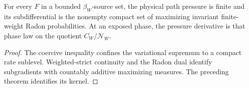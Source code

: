 \begin{corollary}
\label{cor:r4-a3-strict-tangent}
For every \(F\) in a bounded \(\beta_W\)-source set, the physical path
pressure is finite and its subdifferential is the nonempty compact set of
maximizing invariant finite-weight Radon probabilities.  At an exposed phase,
the pressure derivative is that phase law on the quotient
\(C_W/\mathscr N_W\).
\end{corollary}

\begin{proof}
The coercive inequality confines the variational supremum to a compact rate
sublevel.  Weighted-strict continuity and the Radon dual identify subgradients
with countably additive maximizing measures.  The preceding theorem identifies
its kernel.
\end{proof}
